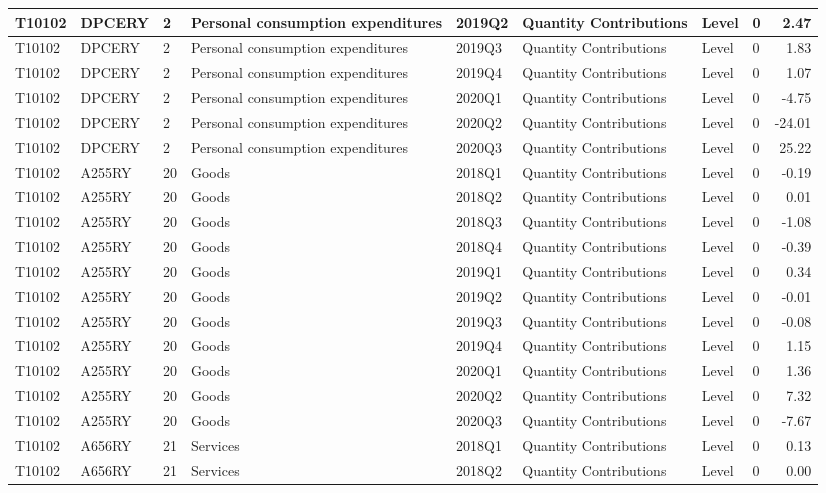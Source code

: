 \documentclass[
]{article}
\begin{document}
\begin{tabular}{l|l|l|l|l|l|l|l|r}
\hline
T10102 & DPCERY & 2 & Personal consumption expenditures & 2019Q2 & Quantity Contributions & Level & 0 & 2.47\\
\hline
T10102 & DPCERY & 2 & Personal consumption expenditures & 2019Q3 & Quantity Contributions & Level & 0 & 1.83\\
\hline
T10102 & DPCERY & 2 & Personal consumption expenditures & 2019Q4 & Quantity Contributions & Level & 0 & 1.07\\
\hline
T10102 & DPCERY & 2 & Personal consumption expenditures & 2020Q1 & Quantity Contributions & Level & 0 & -4.75\\
\hline
T10102 & DPCERY & 2 & Personal consumption expenditures & 2020Q2 & Quantity Contributions & Level & 0 & -24.01\\
\hline
T10102 & DPCERY & 2 & Personal consumption expenditures & 2020Q3 & Quantity Contributions & Level & 0 & 25.22\\
\hline
T10102 & A255RY & 20 & Goods & 2018Q1 & Quantity Contributions & Level & 0 & -0.19\\
\hline
T10102 & A255RY & 20 & Goods & 2018Q2 & Quantity Contributions & Level & 0 & 0.01\\
\hline
T10102 & A255RY & 20 & Goods & 2018Q3 & Quantity Contributions & Level & 0 & -1.08\\
\hline
T10102 & A255RY & 20 & Goods & 2018Q4 & Quantity Contributions & Level & 0 & -0.39\\
\hline
T10102 & A255RY & 20 & Goods & 2019Q1 & Quantity Contributions & Level & 0 & 0.34\\
\hline
T10102 & A255RY & 20 & Goods & 2019Q2 & Quantity Contributions & Level & 0 & -0.01\\
\hline
T10102 & A255RY & 20 & Goods & 2019Q3 & Quantity Contributions & Level & 0 & -0.08\\
\hline
T10102 & A255RY & 20 & Goods & 2019Q4 & Quantity Contributions & Level & 0 & 1.15\\
\hline
T10102 & A255RY & 20 & Goods & 2020Q1 & Quantity Contributions & Level & 0 & 1.36\\
\hline
T10102 & A255RY & 20 & Goods & 2020Q2 & Quantity Contributions & Level & 0 & 7.32\\
\hline
T10102 & A255RY & 20 & Goods & 2020Q3 & Quantity Contributions & Level & 0 & -7.67\\
\hline
T10102 & A656RY & 21 & Services & 2018Q1 & Quantity Contributions & Level & 0 & 0.13\\
\hline
T10102 & A656RY & 21 & Services & 2018Q2 & Quantity Contributions & Level & 0 & 0.00\\

\end{tabular}
\end{document}
